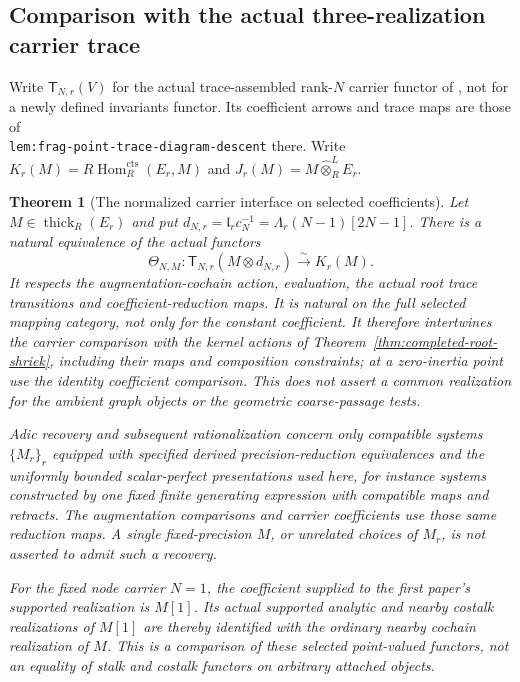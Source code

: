 \documentclass[11pt]{article}
\newtheorem{theorem}[proposition]{Theorem}
\theoremstyle{definition}
\theoremstyle{remark}
\begin{document}
\subsection{Comparison with the actual three-realization carrier trace}
\label{sec:carrier-interface}
Write $\mathsf T_{N,r}(V)$ for the actual trace-assembled rank-$N$
carrier functor of \cite{Local}, not for a newly defined invariants
functor.  Its coefficient arrows and trace maps are those of\\
\texttt{lem:frag-point-trace-diagram-descent} there.  Write
$K_r(M)=R\operatorname{Hom}^{\mathrm{cts}}_R(E_r,M)$ and
$J_r(M)=M\widehat\otimes_R^LE_r$.

\begin{theorem}[The normalized carrier interface on selected coefficients]
\label{thm:selected-carrier-interface}
Let $M\in\operatorname{thick}_R(E_r)$ and put
$d_{N,r}=\mathfrak l_r c_N^{-1}=\Lambda_r(N-1)[2N-1]$.
There is a natural equivalence of the actual functors
\begin{equation}
 \Theta_{N,M}:\mathsf T_{N,r}(M\otimes d_{N,r})
        \xrightarrow{\sim} K_r(M).
 \label{eq:selected-carrier-interface}
\end{equation}
It respects the augmentation-cochain action, evaluation, the actual
root trace transitions and coefficient-reduction maps.  It is
natural on the full selected mapping category, not only for the
constant coefficient.  It therefore intertwines the carrier
comparison with the kernel actions of
Theorem~\ref{thm:completed-root-shriek}, including their maps and
composition constraints; at a zero-inertia point use the identity
coefficient comparison.  This does not assert a common realization
for the ambient graph objects or the geometric coarse-passage tests.

Adic recovery and subsequent rationalization concern only compatible
systems $\{M_r\}_r$ equipped with specified derived precision-reduction
equivalences and the uniformly bounded scalar-perfect presentations
used here, for instance systems constructed by one fixed finite
generating expression with compatible maps and retracts.  The
augmentation comparisons and carrier coefficients use those same
reduction maps.  A single fixed-precision $M$, or unrelated choices
of $M_r$, is not asserted to admit such a recovery.

For the fixed node carrier $N=1$, the coefficient supplied to the
first paper's supported realization is $M[1]$.  Its actual supported
analytic and nearby costalk realizations of $M[1]$ are thereby
identified with the ordinary nearby cochain realization of $M$.
This is a comparison of these selected point-valued functors, not
an equality of stalk and costalk functors on arbitrary attached
objects.
\end{theorem}
\end{document}
